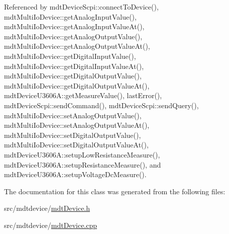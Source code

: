 Referenced by mdt\-Device\-Scpi\-::connect\-To\-Device(), mdt\-Multi\-Io\-Device\-::get\-Analog\-Input\-Value(), mdt\-Multi\-Io\-Device\-::get\-Analog\-Input\-Value\-At(), mdt\-Multi\-Io\-Device\-::get\-Analog\-Output\-Value(), mdt\-Multi\-Io\-Device\-::get\-Analog\-Output\-Value\-At(), mdt\-Multi\-Io\-Device\-::get\-Digital\-Input\-Value(), mdt\-Multi\-Io\-Device\-::get\-Digital\-Input\-Value\-At(), mdt\-Multi\-Io\-Device\-::get\-Digital\-Output\-Value(), mdt\-Multi\-Io\-Device\-::get\-Digital\-Output\-Value\-At(), mdt\-Device\-U3606\-A\-::get\-Measure\-Value(), last\-Error(), mdt\-Device\-Scpi\-::send\-Command(), mdt\-Device\-Scpi\-::send\-Query(), mdt\-Multi\-Io\-Device\-::set\-Analog\-Output\-Value(), mdt\-Multi\-Io\-Device\-::set\-Analog\-Output\-Value\-At(), mdt\-Multi\-Io\-Device\-::set\-Digital\-Output\-Value(), mdt\-Multi\-Io\-Device\-::set\-Digital\-Output\-Value\-At(), mdt\-Device\-U3606\-A\-::setup\-Low\-Resistance\-Measure(), mdt\-Device\-U3606\-A\-::setup\-Resistance\-Measure(), and mdt\-Device\-U3606\-A\-::setup\-Voltage\-Dc\-Measure().



The documentation for this class was generated from the following files\-:\begin{DoxyCompactItemize}
\item 
src/mdtdevice/\hyperlink{mdt_device_8h}{mdt\-Device.\-h}\item 
src/mdtdevice/\hyperlink{mdt_device_8cpp}{mdt\-Device.\-cpp}\end{DoxyCompactItemize}
